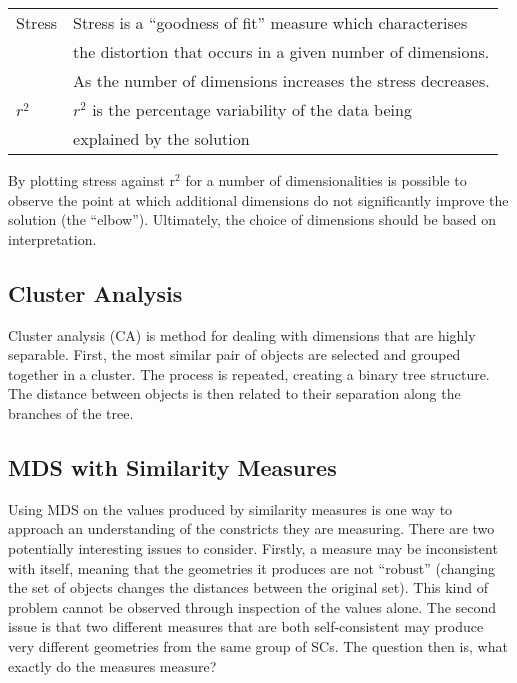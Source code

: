 \documentclass{article}
\begin{document}
\begin{center}
\begin{tabular}{ll}
 Stress  &  Stress is a ``goodness of fit'' measure which characterises  \\
         &  the distortion that occurs in a given number of dimensions.  \\
         &  As the number of dimensions increases the stress decreases.  \\
 $r^2$   &  $r^2$ is the percentage variability of the data being        \\
         &  explained by the solution                                    \\
\end{tabular}
\end{center}


By plotting stress against r$^2$ for a number of dimensionalities is
possible to observe the point at which additional dimensions do not
significantly improve the solution (the ``elbow''). Ultimately, the
choice of dimensions should be based on interpretation.
\subsection{Cluster Analysis}
\label{sec-4-2}

Cluster analysis (CA) is method for dealing with dimensions that are
highly separable. First, the most similar pair of objects are selected
and grouped together in a cluster. The process is repeated, creating a
binary tree structure. The distance between objects is then related to
their separation along the branches of the tree.
\subsection{MDS with Similarity Measures}
\label{sec-4-3}

Using MDS on the values produced by similarity measures is one way to
approach an understanding of the constricts they are measuring. There
are two potentially interesting issues to consider. Firstly, a measure
may be inconsistent with itself, meaning that the geometries it
produces are not ``robust'' (changing the set of objects changes the
distances between the original set). This kind of problem cannot be
observed through inspection of the values alone. The second issue is
that two different measures that are both self-consistent may produce
very different geometries from the same group of SCs. The question then
is, what exactly do the measures measure?
\end{document}
